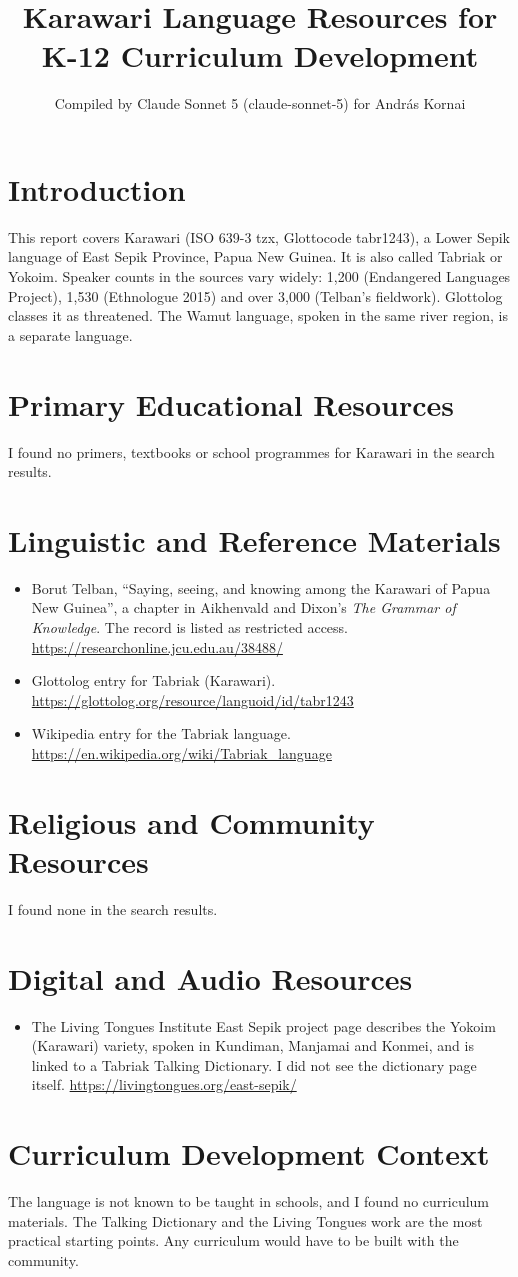 \documentclass[12pt]{article}
\title{Karawari Language Resources for K-12 Curriculum Development}
\author{Compiled by Claude Sonnet 5 (claude-sonnet-5) for Andr\'as Kornai}
\date{}
\begin{document}
\maketitle

\section{Introduction}
This report covers Karawari (ISO 639-3 tzx, Glottocode tabr1243), a Lower Sepik language of East Sepik Province, Papua New Guinea. It is also called Tabriak or Yokoim. Speaker counts in the sources vary widely: 1,200 (Endangered Languages Project), 1,530 (Ethnologue 2015) and over 3,000 (Telban's fieldwork). Glottolog classes it as threatened. The Wamut language, spoken in the same river region, is a separate language.

\section{Primary Educational Resources}
I found no primers, textbooks or school programmes for Karawari in the search results.

\section{Linguistic and Reference Materials}
\begin{itemize}
\item Borut Telban, ``Saying, seeing, and knowing among the Karawari of Papua New Guinea'', a chapter in Aikhenvald and Dixon's \emph{The Grammar of Knowledge}. The record is listed as restricted access. \url{https://researchonline.jcu.edu.au/38488/}
\item Glottolog entry for Tabriak (Karawari). \url{https://glottolog.org/resource/languoid/id/tabr1243}
\item Wikipedia entry for the Tabriak language. \url{https://en.wikipedia.org/wiki/Tabriak_language}
\end{itemize}

\section{Religious and Community Resources}
I found none in the search results.

\section{Digital and Audio Resources}
\begin{itemize}
\item The Living Tongues Institute East Sepik project page describes the Yokoim (Karawari) variety, spoken in Kundiman, Manjamai and Konmei, and is linked to a Tabriak Talking Dictionary. I did not see the dictionary page itself. \url{https://livingtongues.org/east-sepik/}
\end{itemize}

\section{Curriculum Development Context}
The language is not known to be taught in schools, and I found no curriculum materials. The Talking Dictionary and the Living Tongues work are the most practical starting points. Any curriculum would have to be built with the community.
\end{document}

